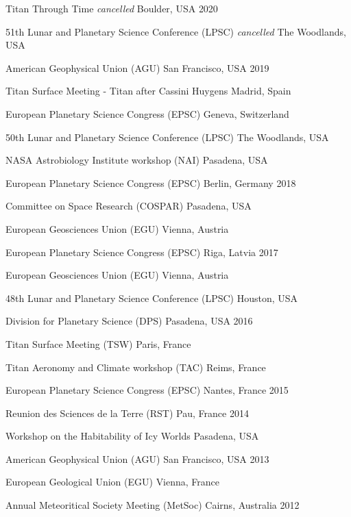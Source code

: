 
\begin{cvhonors}

    \cvhonor
    {Titan Through Time}
    {\textit{\scriptsize cancelled}}
    {Boulder, USA}
    {2020}

    \cvhonor
    {51th Lunar and Planetary Science Conference (LPSC)}
    {\textit{\scriptsize cancelled}}
    {The Woodlands, USA}
    {}

    \cvhonor
    {American Geophysical Union (AGU)}
    {}
    {San Francisco, USA}
    {2019}

    \cvhonor
    {Titan Surface Meeting - Titan after Cassini Huygens}
    {}
    {Madrid, Spain}
    {}

    \cvhonor
    {European Planetary Science Congress (EPSC)}
    {}
    {Geneva, Switzerland}
    {}

    \cvhonor
    {50th Lunar and Planetary Science Conference (LPSC)}
    {}
    {The Woodlands, USA}
    {}

    \cvhonor
    {NASA Astrobiology Institute workshop (NAI)}
    {}
    {Pasadena, USA}
    {}

    \cvhonor
    {European Planetary Science Congress (EPSC)}
    {}
    {Berlin, Germany}
    {2018}

    \cvhonor
    {Committee on Space Research (COSPAR)}
    {}
    {Pasadena, USA}
    {}

    \cvhonor
    {European Geosciences Union (EGU)}
    {}
    {Vienna, Austria}
    {}

    \cvhonor
    {European Planetary Science Congress (EPSC)}
    {}
    {Riga, Latvia}
    {2017}

  \cvhonor
    {European Geosciences Union (EGU)}
    {}
    {Vienna, Austria}
    {}

  \cvhonor
    {48th Lunar and Planetary Science Conference (LPSC)}
    {}
    {Houston, USA}
    {}

  \cvhonor
    {Division for Planetary Science (DPS)}
    {}
    {Pasadena, USA}
    {2016}

  \cvhonor
    {Titan Surface Meeting (TSW)}
    {}
    {Paris, France}
    {}

    \cvhonor
    {Titan Aeronomy and Climate workshop (TAC)}
    {}
    {Reims, France}
    {}

  \cvhonor
    {European Planetary Science Congress (EPSC)}
    {}
    {Nantes, France}
    {2015}

  \cvhonor
    {Reunion des Sciences de la Terre (RST)}
    {}
    {Pau, France}
    {2014}

  \cvhonor
    {Workshop on the Habitability of Icy Worlds}
    {}
    {Pasadena, USA}
    {}

  \cvhonor
    {American Geophysical Union (AGU)}
    {}
    {San Francisco, USA}
    {2013}

  \cvhonor
    {European Geological Union (EGU)}
    {}
    {Vienna, France}
    {}

  \cvhonor
    {Annual Meteoritical Society Meeting (MetSoc)}
    {}
    {Cairns, Australia}
    {2012}


\end{cvhonors}
